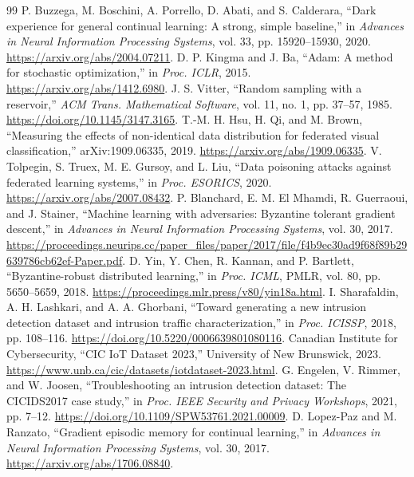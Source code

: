 \documentclass[10pt,a4paper]{article}
\begin{document}
\begin{thebibliography}{99}
 P. Buzzega, M. Boschini, A. Porrello, D. Abati, and S. Calderara, ``Dark experience for general continual learning: A strong, simple baseline,'' in \emph{Advances in Neural Information Processing Systems}, vol. 33, pp. 15920--15930, 2020. \url{https://arxiv.org/abs/2004.07211}.
 D. P. Kingma and J. Ba, ``Adam: A method for stochastic optimization,'' in \emph{Proc. ICLR}, 2015. \url{https://arxiv.org/abs/1412.6980}.
 J. S. Vitter, ``Random sampling with a reservoir,'' \emph{ACM Trans. Mathematical Software}, vol. 11, no. 1, pp. 37--57, 1985. \url{https://doi.org/10.1145/3147.3165}.
 T.-M. H. Hsu, H. Qi, and M. Brown, ``Measuring the effects of non-identical data distribution for federated visual classification,'' arXiv:1909.06335, 2019. \url{https://arxiv.org/abs/1909.06335}.
 V. Tolpegin, S. Truex, M. E. Gursoy, and L. Liu, ``Data poisoning attacks against federated learning systems,'' in \emph{Proc. ESORICS}, 2020. \url{https://arxiv.org/abs/2007.08432}.
 P. Blanchard, E. M. El Mhamdi, R. Guerraoui, and J. Stainer, ``Machine learning with adversaries: Byzantine tolerant gradient descent,'' in \emph{Advances in Neural Information Processing Systems}, vol. 30, 2017. \url{https://proceedings.neurips.cc/paper_files/paper/2017/file/f4b9ec30ad9f68f89b29639786cb62ef-Paper.pdf}.
 D. Yin, Y. Chen, R. Kannan, and P. Bartlett, ``Byzantine-robust distributed learning,'' in \emph{Proc. ICML}, PMLR, vol. 80, pp. 5650--5659, 2018. \url{https://proceedings.mlr.press/v80/yin18a.html}.
 I. Sharafaldin, A. H. Lashkari, and A. A. Ghorbani, ``Toward generating a new intrusion detection dataset and intrusion traffic characterization,'' in \emph{Proc. ICISSP}, 2018, pp. 108--116. \url{https://doi.org/10.5220/0006639801080116}.
 Canadian Institute for Cybersecurity, ``CIC IoT Dataset 2023,'' University of New Brunswick, 2023. \url{https://www.unb.ca/cic/datasets/iotdataset-2023.html}.
 G. Engelen, V. Rimmer, and W. Joosen, ``Troubleshooting an intrusion detection dataset: The CICIDS2017 case study,'' in \emph{Proc. IEEE Security and Privacy Workshops}, 2021, pp. 7--12. \url{https://doi.org/10.1109/SPW53761.2021.00009}.
 D. Lopez-Paz and M. Ranzato, ``Gradient episodic memory for continual learning,'' in \emph{Advances in Neural Information Processing Systems}, vol. 30, 2017. \url{https://arxiv.org/abs/1706.08840}.

\end{thebibliography}
\end{document}
